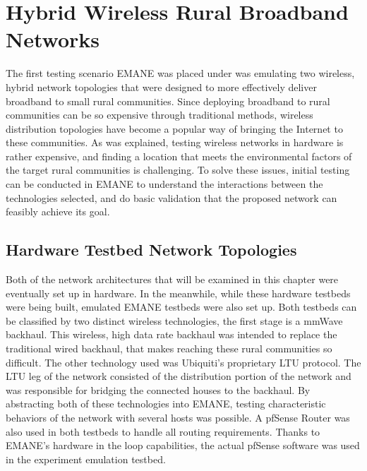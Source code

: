 \chapter{Hybrid Wireless Rural Broadband Networks}
\label{chapter3}
The first testing scenario EMANE was placed under was emulating two wireless, hybrid network topologies that were designed to more effectively deliver broadband to small rural communities.
Since deploying broadband to rural communities can be so expensive through traditional methods, wireless distribution topologies have become a popular way of bringing the Internet to these communities.
As was explained, testing wireless networks in hardware is rather expensive, and finding a location that meets the environmental factors of the target rural communities is challenging.
To solve these issues, initial testing can be conducted in EMANE to understand the interactions between the technologies selected, and do basic validation that the proposed network can feasibly achieve its goal.

\section{Hardware Testbed Network Topologies}
Both of the network architectures that will be examined in this chapter were eventually set up in hardware.
In the meanwhile, while these hardware testbeds were being built, emulated EMANE testbeds were also set up.
Both testbeds can be classified by two distinct wireless technologies, the first stage is a mmWave backhaul.
This wireless, high data rate backhaul was intended to replace the traditional wired backhaul, that makes reaching these rural communities so difficult.
The other technology used was Ubiquiti's proprietary LTU protocol.
The LTU leg of the network consisted of the distribution portion of the network and was responsible for bridging the connected houses to the backhaul.
By abstracting both of these technologies into EMANE, testing characteristic behaviors of the network with several hosts was possible.
A pfSense Router was also used in both testbeds to handle all routing requirements.
Thanks to EMANE's hardware in the loop capabilities, the actual pfSense software was used in the experiment emulation testbed.


